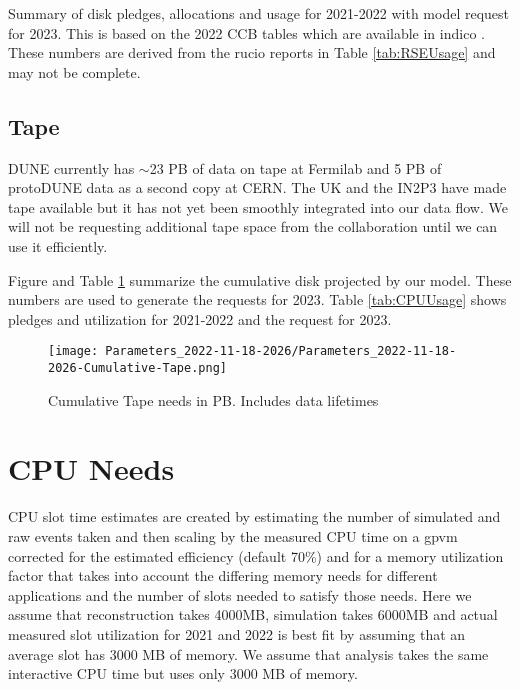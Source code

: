 \documentclass[12pt]{article}
\begin{document}
\begin{table}[ht]
\centering{}
\caption{Summary of disk pledges, allocations and usage for 2021-2022 with model request for 2023.  This is based on the 2022 CCB tables which are available in indico  \cite{CCB2022,CCB2023}.  These numbers are derived from the rucio reports in Table \ref{tab:RSEUsage} and may not be complete. }
\label{tab:DiskPledges}
\end{table}

\subsection{Tape}

DUNE currently has $\sim$23 PB of data on tape at Fermilab and 5 PB of protoDUNE data as a second copy at CERN.  The UK and the IN2P3 have made tape available but it has not yet been smoothly integrated into our data flow.  We will not be requesting additional tape space from the collaboration until we can use it efficiently. 

Figure and Table  \ref{fig:Cumulative-Tape}  summarize the cumulative disk projected by our model. These numbers are used to generate the requests for 2023. Table \ref{tab:CPUUsage} shows pledges and utilization for 2021-2022 and the request for 2023.

\begin{figure}[h]
\centering\texttt{[image: Parameters\_2022-11-18-2026/Parameters\_2022-11-18-2026-Cumulative-Tape.png]}

\caption{Cumulative Tape needs in PB. Includes data lifetimes}\label{fig:Cumulative-Tape}
\end{figure}

\section{CPU Needs}

CPU  slot time estimates are created by estimating the number of simulated and raw events taken and then scaling by the measured CPU time on a gpvm corrected for the estimated efficiency (default 70\%) and for a memory utilization factor that takes into account the differing memory needs for different applications and the number of slots needed to satisfy those needs.  Here we assume that reconstruction takes 4000MB, simulation takes 6000MB and actual measured  slot utilization for 2021 and 2022 is best fit by assuming that an average slot has 3000 MB of memory.    We assume that analysis takes the same interactive CPU time but uses only 3000 MB of memory.  
\end{document}
